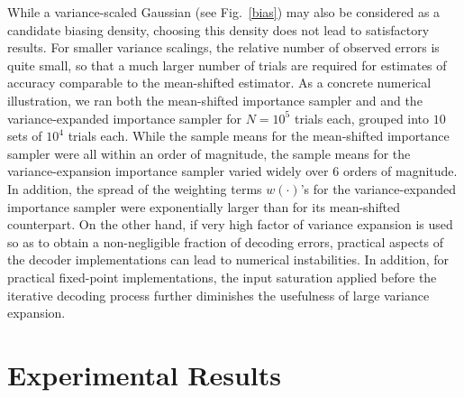While a variance-scaled Gaussian (see Fig.~\ref{bias}) may also be
considered as a candidate biasing density, choosing this density does
not lead to satisfactory results.  For smaller variance scalings, the
relative number of observed errors is quite small, so that a much
larger number of trials are required for estimates of accuracy
comparable to the mean-shifted estimator.
As a concrete numerical illustration, we ran both the mean-shifted
importance sampler and and the variance-expanded importance sampler
for $N = 10^5$ trials each, grouped into $10$ sets of $10^4$ trials
each.  While the sample means for the mean-shifted importance sampler
were all within an order of magnitude, the sample means for the
variance-expansion importance sampler varied widely over 6 orders of
magnitude. In addition, the spread of the weighting terms $w(\cdot)$'s
for the variance-expanded importance sampler were exponentially larger
than for its mean-shifted counterpart.
On the other hand, if very high factor of variance expansion is used
so as to obtain a non-negligible fraction of decoding errors,
practical aspects of the decoder implementations can lead to numerical
instabilities.  In addition, for practical fixed-point
implementations, the input saturation applied before the iterative
decoding process further diminishes the usefulness of large variance
expansion.



\section{Experimental Results}
\label{analysis}

